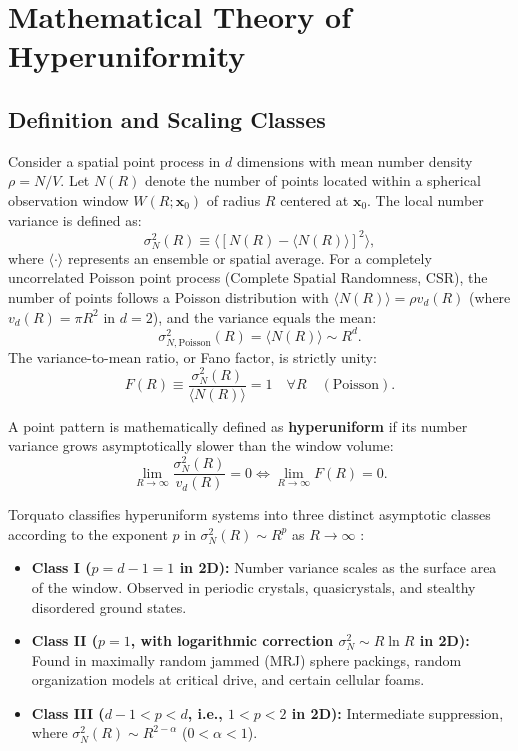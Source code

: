 \documentclass[10pt,twocolumn]{article}
\begin{document}
\section{Mathematical Theory of Hyperuniformity}
\label{sec:theory}

\subsection{Definition and Scaling Classes}
Consider a spatial point process in $d$ dimensions with mean number density $\rho = N / V$. Let $N(R)$ denote the number of points located within a spherical observation window $W(R; \mathbf{x}_0)$ of radius $R$ centered at $\mathbf{x}_0$. The local number variance is defined as:
\begin{equation}
    \sigma_N^2(R) \equiv \langle [N(R) - \langle N(R) \rangle]^2 \rangle,
\end{equation}
where $\langle \cdot \rangle$ represents an ensemble or spatial average. For a completely uncorrelated Poisson point process (Complete Spatial Randomness, CSR), the number of points follows a Poisson distribution with $\langle N(R) \rangle = \rho v_d(R)$ (where $v_d(R) = \pi R^2$ in $d=2$), and the variance equals the mean:
\begin{equation}
    \sigma_{N,\mathrm{Poisson}}^2(R) = \langle N(R) \rangle \sim R^d.
\end{equation}
The variance-to-mean ratio, or Fano factor, is strictly unity:
\begin{equation}
    F(R) \equiv \frac{\sigma_N^2(R)}{\langle N(R) \rangle} = 1 \quad \forall R \quad (\text{Poisson}).
\end{equation}

A point pattern is mathematically defined as \textbf{hyperuniform} if its number variance grows asymptotically slower than the window volume:
\begin{equation}
    \lim_{R \to \infty} \frac{\sigma_N^2(R)}{v_d(R)} = 0 \iff \lim_{R \to \infty} F(R) = 0.
\end{equation}

Torquato classifies hyperuniform systems into three distinct asymptotic classes according to the exponent $p$ in $\sigma_N^2(R) \sim R^p$ as $R \to \infty$ \cite{torquato2018hyperuniform}:
\begin{itemize}
    \item \textbf{Class I ($p = d-1 = 1$ in 2D):} Number variance scales as the surface area of the window. Observed in periodic crystals, quasicrystals, and stealthy disordered ground states.
    \item \textbf{Class II ($p = 1$, with logarithmic correction $\sigma_N^2 \sim R \ln R$ in 2D):} Found in maximally random jammed (MRJ) sphere packings, random organization models at critical drive, and certain cellular foams.
    \item \textbf{Class III ($d-1 < p < d$, i.e., $1 < p < 2$ in 2D):} Intermediate suppression, where $\sigma_N^2(R) \sim R^{2-\alpha}$ ($0 < \alpha < 1$).
\end{itemize}
\end{document}
